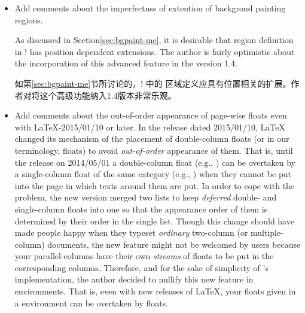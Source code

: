 \begin{itemize}
 As the author confessed in Section\Tie\ref{sec:ppts-paired}, right
 \parapag{}es cannot have \pwstuff{} but have blank spaces in the
 corresponding region for them.  The author will try to remove this
 limitation from a future version of \Paracol, in the version 1.4 hopefully.

正如作者在第\ref{sec:ppts-paired}节中承认的那样，右侧的\parapag{}不能有\pwstuff{}，但在相应的区域中有空白。作者将努力在未来的\Paracol{}版本中消除这个限制，希望是1.4版本。
 \item
	{Add comments about the imperfectnss of extention of backgrond
	 painting regions.}
 \begin{Hfuzz}{1.5pt}
 As discussed in Section\Tie\ref{sec:bgpaint-me}, it is desirable that
 \bgpaint{} region definition in \!\backgroundcolor! has position dependent
 extensions.  The author is fairly optimistic about the incorporation of
 this advanced feature in the version 1.4.

如第\ref{sec:bgpaint-me}节所讨论的，\!\backgroundcolor! 中的 \bgpaint{} 区域定义应具有位置相关的扩展。作者对将这个高级功能纳入1.4版本非常乐观。
 \end{Hfuzz}
 
 \item
	{Add comments about the out-of-order appearance of page-wise floats
	 even with \protect\LaTeX-2015/01/10 or later.}
 In the release dated 2015/01/10, \LaTeX{} changed its mechanism of the
 placement of double-column floats (or in our terminology, \pwise{}
 floats) to avoid {\em out-of-order\/} appearance of them.  That is, until
 the release on 2014/05/01 a double-column float (e.g., ) can
 be overtaken by a single-column float of the same category (e.g.,
 ) when they cannot be put into the page in which texts around
 them are put.  In order to cope with the problem, the new version merged
 two lists to keep {\em deferred\/} double- and single-column floats into
 one so that the appearance order of them is determined by their order in
 the single list.  Though this change should have made people happy when
 they typeset {\em ordinary\/} two-column (or multiple-column) documents,
 the new feature might not be welcomed by \Paracol{} users because your
 parallel-columns have their own {\em streams\/} of floats to be put in the
 corresponding columns.  Therefore, and for the sake of simplicity of
 \Paracol's implementation, the author decided to nullify this new feature
 in  environments.  That is, even with new releases of
 \LaTeX{}, your \pwise{} floats given in a  environment can be
 overtaken by \cwise{} floats.


\end{itemize}
